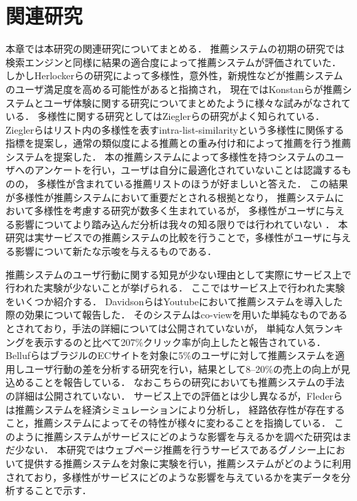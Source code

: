 \documentclass[japanese]{jnlp_1.4}
\begin{document}
\section{関連研究}
\label{sec:related}

本章では本研究の関連研究についてまとめる．
推薦システムの初期の研究では検索エンジンと同様に結果の適合度によって推薦システムが評価されていた\cite{Jannach2010}．
しかしHerlockerらの研究によって多様性，意外性，新規性などが推薦システムのユーザ満足度を高める可能性があると指摘され\cite{herlocker2004}，
現在ではKonstanらが推薦システムとユーザ体験に関する研究についてまとめたように様々な試みがなされている\cite{Konstan2012}．
多様性に関する研究としてはZieglerらの研究がよく知られている\cite{ziegler2005}．
Zieglerらはリスト内の多様性を表すintra-list-similarityという多様性に関係する指標を提案し，通常の類似度による推薦との重み付け和によって推薦を行う推薦システムを提案した．
本の推薦システムによって多様性を持つシステムのユーザへのアンケートを行い，ユーザは自分に最適化されていないことは認識するものの，
多様性が含まれている推薦リストのほうが好ましいと答えた．
この結果が多様性が推薦システムにおいて重要だとされる根拠となり，
推薦システムにおいて多様性を考慮する研究が数多く生まれているが，
多様性がユーザに与える影響についてより踏み込んだ分析は我々の知る限りでは行われていない
\cite{murakami2009,zhang2008avoiding,lathia2010temporal}．
本研究は実サービスでの推薦システムの比較を行うことで，多様性がユーザに与える影響について新たな示唆を与えるものである．

推薦システムのユーザ行動に関する知見が少ない理由として実際にサービス上で行われた実験が少ないことが挙げられる．
ここではサービス上で行われた実験をいくつか紹介する．
DavidsonらはYoutubeにおいて推薦システムを導入した際の効果について報告した\cite{davidson2010youtube}．
そのシステムはco-viewを用いた単純なものであるとされており，手法の詳細については公開されていないが，
単純な人気ランキングを表示するのと比べて207\%クリック率が向上したと報告されている．
BellufらはブラジルのECサイトを対象に5\%のユーザに対して推薦システムを適用しユーザ行動の差を分析する研究を行い，結果として8--20\%の売上の向上が見込めることを報告している\cite{belluf2012case}．
なおこちらの研究においても推薦システムの手法の詳細は公開されていない．
サービス上での評価とは少し異なるが，Flederらは推薦システムを経済シミュレーションにより分析し\cite{fleder2007recommender}，
経路依存性が存在すること，推薦システムによってその特性が様々に変わることを指摘している．
このように推薦システムがサービスにどのような影響を与えるかを調べた研究はまだ少ない．
本研究ではウェブページ推薦を行うサービスであるグノシー上において提供する推薦システムを対象に実験を行い，推薦システムがどのように利用されており，多様性がサービスにどのような影響を与えているかを実データを分析することで示す．
\end{document}
